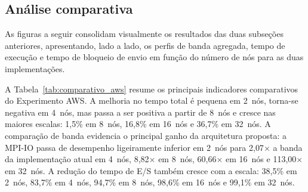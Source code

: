 \subsection{Análise comparativa}
\label{sec:avaliacao_comparativa_aws}
As figuras a seguir consolidam visualmente os resultados das duas
subseções anteriores, apresentando, lado a lado, os perfis de banda
agregada, tempo de execução e tempo de bloqueio de envio em função do
número de nós para as duas implementações.

A Tabela~\ref{tab:comparativo_aws} resume os principais indicadores
comparativos do Experimento AWS. A melhoria no tempo total é pequena em
2~nós, torna-se negativa em 4~nós, mas passa a ser positiva a partir de
8~nós e cresce nas maiores escalas: 1{,}5\% em 8~nós, 16{,}8\% em
16~nós e 36{,}7\% em 32~nós. A comparação de banda evidencia o principal
ganho da arquitetura proposta: a MPI-IO passa de desempenho
ligeiramente inferior em 2~nós para 2{,}07$\times$ a banda da
implementação atual em 4~nós, 8{,}82$\times$ em 8~nós, 60{,}66$\times$
em 16~nós e 113{,}00$\times$ em 32~nós. A redução do tempo de E/S também
cresce com a escala: 38{,}5\% em 2~nós, 83{,}7\% em 4~nós, 94{,}7\% em
8~nós, 98{,}6\% em 16~nós e 99{,}1\% em 32~nós.

